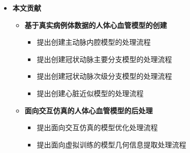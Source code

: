 \begin{frame}
\begin{itemize}
  \item \textbf{本文贡献}
  \begin{itemize}
     \item \textbf{基于真实病例体数据的人体心血管模型的创建}
    \begin{itemize}
       \item 提出创建主动脉内腔模型的处理流程
       \item 提出创建冠状动脉主要分支模型的处理流程
       \item 提出创建冠状动脉次级分支模型的处理流程
       \item 提出创建心脏近似模型的处理流程
    \end{itemize}
     \item \textbf{面向交互仿真的人体心血管模型的后处理}
    \begin{itemize}
       \item 提出面向交互仿真的模型优化处理流程
       \item 提出面向虚拟训练的模型几何信息提取处理流程
    \end{itemize}
  \end{itemize}
\end{itemize}
\end{frame} 